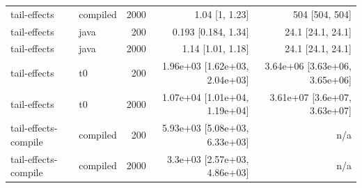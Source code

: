 \begin{tabular}{llrrr}
tail-effects & compiled & 2000 & 1.04 [1, 1.23] & 504 [504, 504] \\
tail-effects & java & 200 & 0.193 [0.184, 1.34] & 24.1 [24.1, 24.1] \\
tail-effects & java & 2000 & 1.14 [1.01, 1.18] & 24.1 [24.1, 24.1] \\
tail-effects & t0 & 200 & 1.96e+03 [1.62e+03, 2.04e+03] & 3.64e+06 [3.63e+06, 3.65e+06] \\
tail-effects & t0 & 2000 & 1.07e+04 [1.01e+04, 1.19e+04] & 3.61e+07 [3.6e+07, 3.63e+07] \\
tail-effects-compile & compiled & 200 & 5.93e+03 [5.08e+03, 6.33e+03] & n/a \\
tail-effects-compile & compiled & 2000 & 3.3e+03 [2.57e+03, 4.86e+03] & n/a \\
\bottomrule
\end{tabular}
